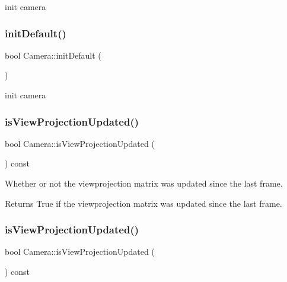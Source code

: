 init camera \mbox{\label{classCamera_a4bdc70b1156c5b4cbdb5706cb75fb598}} 
\subsubsection{\texorpdfstring{init\+Default()}{initDefault()}\hspace{0.1cm}{\footnotesize\ttfamily [2/2]}}
{\footnotesize\ttfamily bool Camera\+::init\+Default (\begin{DoxyParamCaption}{ }\end{DoxyParamCaption})}

init camera \mbox{\label{classCamera_afba312d6b30f3d137e9c173f7fa334e6}} 
\subsubsection{\texorpdfstring{is\+View\+Projection\+Updated()}{isViewProjectionUpdated()}\hspace{0.1cm}{\footnotesize\ttfamily [1/2]}}
{\footnotesize\ttfamily bool Camera\+::is\+View\+Projection\+Updated (\begin{DoxyParamCaption}{ }\end{DoxyParamCaption}) const\hspace{0.3cm}{\ttfamily [inline]}}

Whether or not the viewprojection matrix was updated since the last frame. \begin{DoxyReturn}{Returns}
True if the viewprojection matrix was updated since the last frame. 
\end{DoxyReturn}
\mbox{\label{classCamera_afba312d6b30f3d137e9c173f7fa334e6}} 
\subsubsection{\texorpdfstring{is\+View\+Projection\+Updated()}{isViewProjectionUpdated()}\hspace{0.1cm}{\footnotesize\ttfamily [2/2]}}
{\footnotesize\ttfamily bool Camera\+::is\+View\+Projection\+Updated (\begin{DoxyParamCaption}{ }\end{DoxyParamCaption}) const\hspace{0.3cm}{\ttfamily [inline]}}

